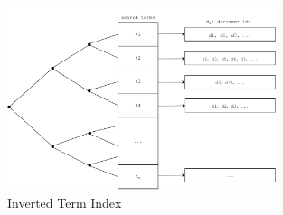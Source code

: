 \begin{figure}
    \centering
    \includegraphics[width=0.7\textwidth]{my/chapters/background/figures/inverted-term-index.dio.svg.pdf}
    \caption{Inverted Term Index}
    \label{fig:inverted_term_index}
\end{figure}
